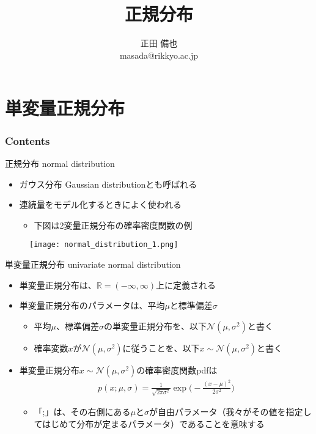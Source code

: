 \documentclass[aspectratio=169,unicode,dvipdfmx,14pt]{beamer}
\title{\ \\正規分布}
\author{正田 備也\\{\small masada@rikkyo.ac.jp}}
\date{}
\begin{document}
\begin{frame}
\titlepage
\end{frame}

\section{単変量正規分布}

\begin{frame}\frametitle{Contents}
\Large \tableofcontents[currentsection]
\end{frame}

\begin{frame}{正規分布 normal distribution}
\begin{itemize}
\item ガウス分布 Gaussian distributionとも呼ばれる
\item 連続量をモデル化するときによく使われる
\begin{itemize}
\item 下図は2変量正規分布の確率密度関数の例
\end{itemize}
\end{itemize}
\begin{figure}
\center
\texttt{[image: normal\_distribution\_1.png]}
\end{figure}
\end{frame}

\begin{frame}{単変量正規分布 univariate normal distribution}
\begin{itemize}
\item 単変量正規分布は、$\mathbb{R}=(-\infty,\infty)$上に定義される
\item 単変量正規分布のパラメータは、平均$\mu$と標準偏差$\sigma$
\begin{itemize}
\item 平均$\mu$、標準偏差$\sigma$の単変量正規分布を、以下$\mathcal{N}(\mu,\sigma^2)$と書く
\item 確率変数$x$が$\mathcal{N}(\mu,\sigma^2)$に従うことを、以下$x\sim\mathcal{N}(\mu,\sigma^2)$と書く
\end{itemize}
\item 単変量正規分布$x\sim\mathcal{N}(\mu,\sigma^2)$の確率密度関数pdfは
\begin{align}
p(x;\mu,\sigma) = \frac{1}{\sqrt{2\pi\sigma^2}}\exp\Big( - \frac{(x - \mu)^2}{2\sigma^2} \Big)
\end{align}
\begin{itemize}
\item 「;」は、その右側にある$\mu$と$\sigma$が自由パラメータ（我々がその値を指定してはじめて分布が定まるパラメータ）であることを意味する
\end{itemize}
\end{itemize}
\end{frame}
\end{document}
